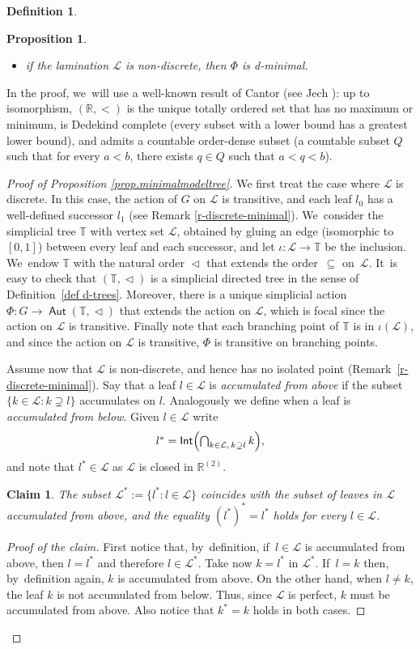 \documentclass[JEP,XML,SOM,Unicode,NoFloatCountersInSection,published]{cedram}
\newtheorem*{claim}{Claim}
\newtheorem{prop}[thm]{Proposition}
\theoremstyle{definition}
\newtheorem{dfn}[thm]{Definition}
\DeclareMathOperator{\Aut}{\mathsf{Aut}}
\DeclareMathOperator{\Int}{\mathsf{Int}}
\newcommand{\R}{\mathbb{R}}
\newcommand{\Tbb}{\mathbb T}
\newcommand{\Lcal}{\mathcal{L}}
\newcommand{\treeorder}{\mathrel{\triangleleft}}
\begin{document}
\begin{dfn}
\begin{prop}
\begin{itemize}
\item if the lamination $\Lcal$ is non-discrete, then $\Phi $ is d-minimal.
\end{itemize}
\end{prop}

In the proof, we~will use a well-known result of Cantor (see Jech \cite[Th.\,4.3]{Jech}): up to isomorphism, $(\R, <)$ is the unique totally ordered set that has no maximum or minimum, is Dedekind complete (\ie every subset with a lower bound has a greatest lower bound), and admits a countable order-dense subset (\ie a countable subset $Q$ such that for every $a< b$, there exists $q\in Q$ such that $a< q< b$).
\begin{proof}[Proof of Proposition \ref{prop.minimalmodeltree}] We first treat the case where $\Lcal$ is discrete. In this case, the action of $G$ on $\Lcal$ is transitive, and each leaf $l_0$ has a well-defined successor $l_1$ (see Remark \ref{r-discrete-minimal}). We~consider the simplicial tree $\Tbb$ with vertex set $\Lcal$, obtained by gluing an edge (isomorphic to $[0,1]$) between every leaf and each successor, and let $\iota\colon \Lcal\to \Tbb$ be the inclusion. We~endow $\Tbb$ with the natural order $\treeorder$ that extends the order~$\subseteq$ on~$\Lcal$. It~is easy to check that $(\Tbb, \treeorder)$ is a simplicial directed tree in the sense of Definition~\ref{def d-trees}. Moreover, there is a unique simplicial action $\Phi\colon G\to \Aut(\Tbb, \treeorder)$ that extends the action on $\Lcal$, which is focal since the action on $\Lcal$ is transitive. Finally note that each branching point of $\Tbb$ is in $\iota(\Lcal)$, and since the action on $\Lcal$ is transitive, $\Phi $ is transitive on branching points.

Assume now that $\Lcal$ is non-discrete, and hence has no isolated point (Remark~\ref{r-discrete-minimal}). Say that a leaf $l\in\Lcal$ is \emph{accumulated from above} if the subset $\{k\in\Lcal:k\supsetneq l\}$ accumulates on $l$. Analogously we define when a leaf is \emph{accumulated from below}.
Given $l\in\Lcal$ write
\[
\textstyle l^\ast=\Int\Bigl(\bigcap_{k\in\Lcal,\,k\supsetneq l}k\Bigr),
\]
and note that $l^*\in \Lcal$ as $\Lcal$ is closed in $\R^{(2)}$.
\begin{claim}\label{claim.defstar} The subset $\Lcal^\ast:=\{l^\ast:l\in\Lcal\}$ coincides with the subset of leaves in $\Lcal$ accumulated from above, and the equality $(l^\ast)^\ast=l^\ast$ holds for every $l\in\Lcal$.
\end{claim}
\begin{proof}[Proof of the claim]
First notice that, by~definition, if~$l\in \Lcal$ is accumulated from above, then $l=l^\ast$ and therefore $l\in\Lcal^\ast$. Take now $k=l^\ast$ in $\Lcal^\ast$. If~$l=k$ then, by~definition again, $k$ is accumulated from above. On the other hand, when $l\neq k$, the leaf $k$ is not accumulated from below. Thus, since $\Lcal$ is perfect, $k$ must be accumulated from above. Also notice that $k^\ast=k$ holds in both cases.
\end{proof}


\end{proof}
\end{dfn}
\end{document}
